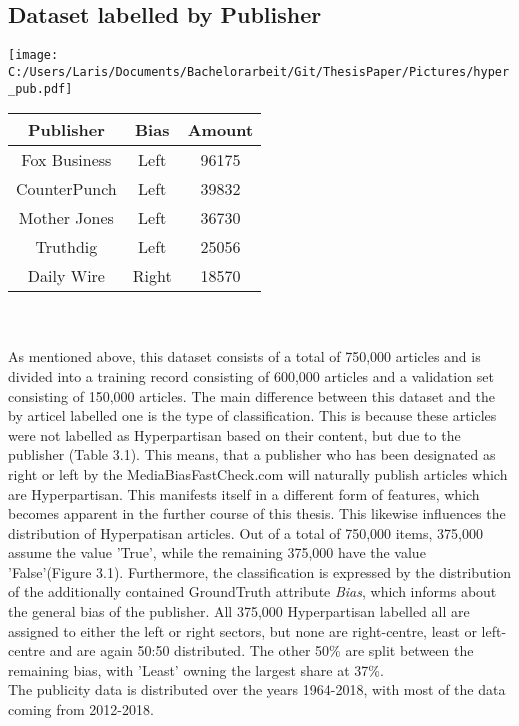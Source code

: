 \documentclass[a4paper, 11pt,titlepage,oneside,openany]{book}
\begin{document}
\subsection{Dataset labelled by Publisher}
\begin{minipage}[T]{.45\linewidth}
	\texttt{[image: C:/Users/Laris/Documents/Bachelorarbeit/Git/ThesisPaper/Pictures/hyper\_pub.pdf]}
\end{minipage}
	\hspace{.1\linewidth}%
\begin{minipage}[T]{.45\linewidth}
	\centering
	\begin{tabular}{ccc}
		\toprule
		Publisher & Bias & Amount \\
		\midrule
		Fox Business & Left & 96175 \\
		CounterPunch & Left & 39832 \\
		Mother Jones & Left & 36730 \\
		Truthdig & Left & 25056 \\
		Daily Wire & Right & 18570 \\
		\bottomrule
	\end{tabular}
\end{minipage}\\
\\ As mentioned above, this dataset consists of a total of 750,000 articles and is divided into a training record consisting of 600,000 articles and a validation set consisting of 150,000 articles.
The main difference between this dataset and the by articel labelled one is the type of classification. This is because these articles were not labelled as Hyperpartisan based on their content, but due to the publisher (Table 3.1). This means, that a publisher who has been designated as right or left by the MediaBiasFastCheck.com will naturally publish articles which are Hyperpartisan. This manifests itself in a different form of features, which becomes apparent in the further course of this thesis. This likewise influences the distribution of Hyperpatisan articles.
 Out of a total of 750,000 items, 375,000 assume the value 'True', while the remaining 375,000 have the value 'False'(Figure 3.1). 
Furthermore, the classification is expressed by the distribution of the additionally contained GroundTruth attribute \textit{Bias}, which informs about the general bias of the publisher. All 375,000 Hyperpartisan labelled all are assigned to either the left or right sectors, but none are right-centre, least or left-centre and are again 50:50 distributed. The other 50\% are split between the remaining bias, with 'Least' owning the largest share at 37\%.\\
The publicity data is distributed over the years 1964-2018, with most of the data coming from 2012-2018.
\end{document}
